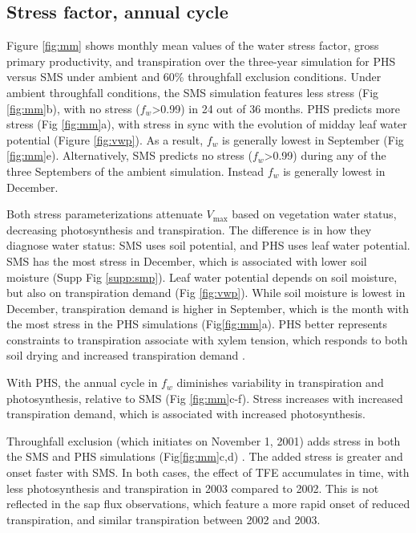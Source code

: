 \documentclass[draft,linenumbers]{agujournal}
\begin{document}
\subsection{Stress factor, annual cycle}

Figure \ref{fig:mm} shows monthly mean values of the water stress factor, gross primary productivity, and transpiration
over the three-year simulation for PHS versus SMS under ambient and 60\% throughfall exclusion conditions.
Under ambient throughfall conditions, the SMS simulation features less stress (Fig \ref{fig:mm}b), with
no stress ($f_w$>0.99) in 24 out of 36 months.
PHS predicts more stress (Fig \ref{fig:mm}a), with stress in sync with the evolution of midday leaf water potential (Figure \ref{fig:vwp}).
As a result, $f_w$ is generally lowest in September (Fig \ref{fig:mm}e).
Alternatively, SMS predicts no stress ($f_w$>0.99) during any of the three Septembers of the ambient simulation.
Instead $f_w$ is generally lowest in December.

Both stress parameterizations attenuate $V_{\text{max}}$ based on vegetation water status, decreasing photosynthesis and transpiration.
The difference is in how they diagnose water status: SMS uses soil potential, and PHS uses leaf water potential.
SMS has the most stress in December, which is associated with lower soil moisture (Supp Fig \ref{supp:smp}).
Leaf water potential depends on soil moisture, but also on transpiration demand (Fig \ref{fig:vwp}).
While soil moisture is lowest in December, transpiration demand is higher in September,
which is the month with the most stress in the PHS simulations (Fig\ref{fig:mm}a).
PHS better represents constraints to transpiration associate with xylem tension, which responds to both soil drying and increased transpiration demand \citep{sperry2015}.

With PHS, the annual cycle in $f_w$ diminishes variability in transpiration and photosynthesis, relative to SMS (Fig \ref{fig:mm}c-f).
Stress increases with increased transpiration demand, which is associated with increased photosynthesis.


Throughfall exclusion (which initiates on November 1, 2001) adds stress in both the SMS and PHS simulations (Fig\ref{fig:mm}c,d) .
The added stress is greater and onset faster with SMS.
In both cases, the effect of TFE accumulates in time, with less photosynthesis and transpiration in 2003 compared to 2002.
This is not reflected in the sap flux observations, which feature a more rapid onset of reduced transpiration, and similar transpiration between 2002 and 2003.
\end{document}
